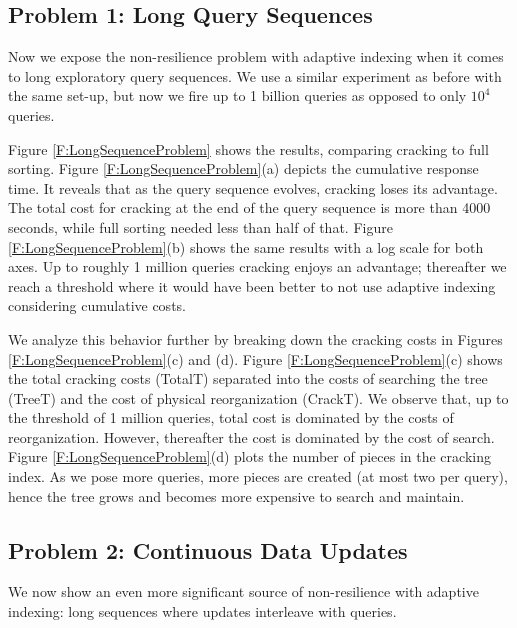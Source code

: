 \documentclass{sig-alternate}
\begin{document}
\subsection{Problem 1: Long Query Sequences}

Now we expose the non-resilience problem with adaptive indexing when it comes to long exploratory query sequences. We use a similar experiment as before with the same set-up, but now we fire up to 1 billion queries as opposed to only $10^4$ queries.

Figure \ref{F:LongSequenceProblem} shows the results, comparing cracking to full sorting. Figure \ref{F:LongSequenceProblem}(a) depicts the cumulative response time. It reveals that as the query sequence evolves, cracking loses its advantage. The total cost for cracking at the end of the query sequence is more than 4000 seconds, while full sorting needed less than half of that. Figure \ref{F:LongSequenceProblem}(b) shows the same results with a log scale for both axes. Up to roughly 1 million queries cracking enjoys an advantage; thereafter we reach a threshold where it would have been better to not use adaptive indexing considering cumulative costs.

We analyze this behavior further by breaking down the cracking costs in Figures \ref{F:LongSequenceProblem}(c) and (d). Figure \ref{F:LongSequenceProblem}(c) shows the total cracking costs (TotalT) separated into the costs of searching the tree (TreeT) and the cost of physical reorganization (CrackT). We observe that, up to the threshold of 1 million queries, total cost is dominated by the costs of reorganization. However, thereafter the cost is dominated by the cost of search. Figure \ref{F:LongSequenceProblem}(d) plots the number of pieces in the cracking index. As we pose more queries, more pieces are created (at most two per query), hence the tree grows and becomes more expensive to search and maintain.


\subsection{Problem 2: Continuous Data Updates}

We now show an even more significant source of non-resilience with adaptive indexing: long sequences where updates interleave with queries.
\end{document}
